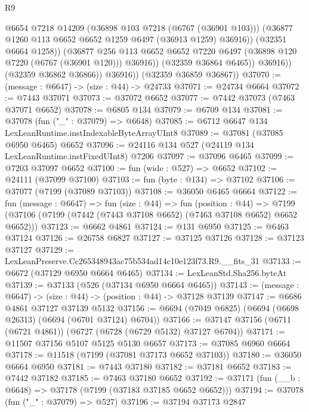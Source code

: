 \begin{lexlean}{R9}
\begin{coremodule}
                        @6654
                        @7218
                        @14209
                        (@36898 @103 @7218 (@6767 (@36901 @103)))
                        (@36877 @1260 @113 @6652 @6652 @1259 @6497 (@36913 @1259) @36916))
                      (@32351 @6664 @1258))
                    (@36877
                      @256
                      @113
                      @6652
                      @6652
                      @7220
                      @6497
                      (@36898 @120 @7220 (@6767 (@36901 @120)))
                      @36916))
                  (@32359 @36864 @6465))
                @36916))
            (@32359 @36862 @36866))
          @36916))
      (@32359 @36859 @36867))
@37070 := (message : @6647) -> (size : @44) -> @24733
@37071 := @24734 @6664
@37072 := @7443 @37071
@37073 := @37072 @6652
@37077 := @7442 @37073 (@7463 @37071 @6652)
@37078 := @6805 @134
@37079 := @6709 @134
@37081 := @37078 (fun ("_" : @37079) => @6648)
@37085 := @6712 @6647 @134 LexLeanRuntime.instIndexableByteArrayUInt8
@37089 := @37081 (@37085 @6950 @6465) @6652
@37096 := @24116 @134 @527 (@24119 @134 LexLeanRuntime.instFixedUInt8) @7206
@37097 := @37096 @6465
@37099 := @7203 @37097 @6652
@37100 := fun (wide : @527) => @6652
@37102 := @24111 (@37099 @37100)
@37103 := fun (byte : @134) => @37102
@37106 := @37077 (@7199 (@37089 @37103))
@37108 := @36050 @6465 @6664
@37122 := fun (message : @6647) =>
  fun (size : @44) =>
  fun (position : @44) =>
  @7199 (@37106 (@7199 (@7442 (@7443 @37108 @6652) (@7463 @37108 @6652) @6652 @6652)))
@37123 := @6662 @4861
@37124 := @131 @6950
@37125 := @6463 @37124
@37126 := @26758 @6827
@37127 := @37125 @37126
@37128 := @37123 @37127
@37129 := LexLeanPreserve.Cc265348943ac75b534ad14c10e123f73.R9.__fits_31
@37133 := @6672 (@37129 @6950 @6664 @6465)
@37134 := LexLeanStd.Sha256.byteAt
@37139 := @37133 (@526 (@37134 @6950 @6664 @6465))
@37143 := (message : @6647) -> (size : @44) -> (position : @44) -> @37128 @37139
@37147 := @6686 @4861 @37127 @37139 @5132
@37156 := @6694 (@7049 @6825) (@6694 (@6698 @26313) (@6694 (@6701 @37124) @6704))
@37166 := @37147 @37156 (@6711 (@6721 @4861)) (@6727 (@6728 (@6729 @5132) @37127 @6704))
@37171 := @11507 @37156 @5107 @5125 @5130 @6657
@37173 := @37085 @6960 @6664
@37178 := @11518 (@7199 (@37081 @37173 @6652 @37103))
@37180 := @36050 @6664 @6950
@37181 := @7443 @37180
@37182 := @37181 @6652
@37183 := @7442 @37182
@37185 := @7463 @37180 @6652
@37192 := @37171 (fun (__b : @6648) => @37178 (@7199 (@37183 @37185 @6652 @6652)))
@37194 := @37078 (fun ("_" : @37079) => @527)
@37196 := @37194 @37173 @2847

\end{coremodule}
\end{lexlean}
